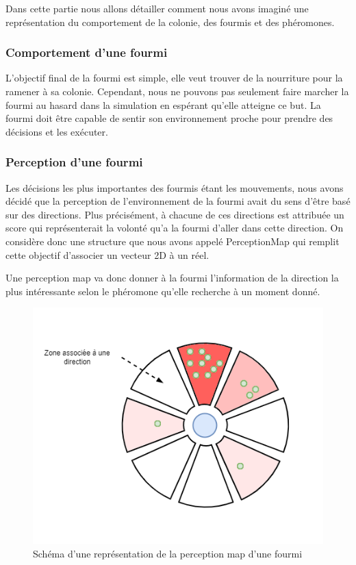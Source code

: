 \documentclass{EPUProjetDi}
\begin{document}
Dans cette partie nous allons détailler comment nous avons imaginé une représentation du comportement de la colonie, des fourmis et des phéromones.

\subsubsection{Comportement d'une fourmi}

L'objectif final de la fourmi est simple, elle veut trouver de la nourriture pour la ramener à sa colonie. Cependant, nous ne pouvons pas seulement
faire marcher la fourmi au hasard dans la simulation en espérant qu'elle atteigne ce but. La fourmi doit être capable de sentir son environnement proche
pour prendre des décisions et les exécuter.

\subsubsection{Perception d'une fourmi}

Les décisions les plus importantes des fourmis étant les mouvements, nous avons décidé que la perception de l'environnement de la fourmi avait du sens
d'être basé sur des directions.
Plus précisément, à chacune de ces directions est attribuée un score qui représenterait la volonté qu'a la fourmi d'aller dans cette direction.
On considère donc une structure que nous avons appelé PerceptionMap qui remplit cette objectif d'associer un vecteur 2D à un réel.

Une perception map va donc donner à la fourmi l'information de la direction la plus intéressante selon le phéromone qu'elle recherche à un moment donné.

\begin{figure}[h]
    \centering
    \includegraphics[scale=0.9]{perceptionmap.png}
    \caption{Schéma d'une représentation de la perception map d'une fourmi}
    \label{fig:perception_map}
\end{figure}
\end{document}
